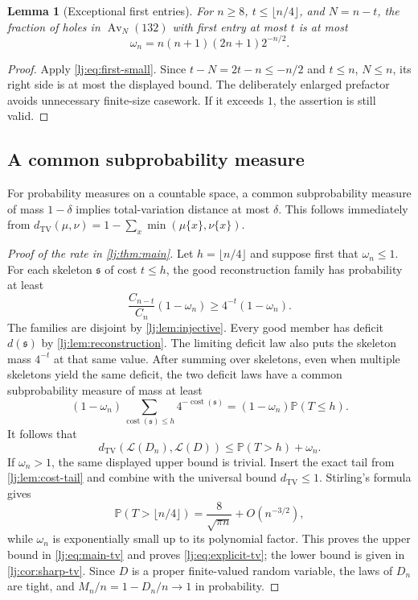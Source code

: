 \documentclass[11pt,a4paper]{article}
\newtheorem{lemma}[lemma]{Lemma}
\theoremstyle{definition}\newaliascnt{definition}{theorem}
\theoremstyle{remark}\newaliascnt{remark}{theorem}
\newcommand{\Av}{\operatorname{Av}}
\newcommand{\ljP}{\mathbb P}
\newcommand{\ljTV}{d_{\mathrm{TV}}}
\newcommand{\ljLaw}{\mathcal L}
\newcommand{\ljskel}{\mathfrak s}
\newcommand{\ljcost}{\operatorname{cost}}
\begin{document}
\begin{lemma}[Exceptional first entries]\label{lj:lem:exception}
For $n\ge8$, $t\le\lfloor n/4\rfloor$, and $N=n-t$, the fraction of
holes in $\Av_N(132)$ with first entry at most $t$ is at most
\begin{equation}
 \omega_n=n(n+1)(2n+1)2^{-n/2}.
 \label{lj:eq:epsilon}
\end{equation}
\end{lemma}
\begin{proof}
Apply \eqref{lj:eq:first-small}. Since $t-N=2t-n\le-n/2$ and
$t\le n$, $N\le n$, its right side is at most the displayed bound.
The deliberately enlarged prefactor avoids unnecessary finite-size
casework. If it exceeds $1$, the assertion is still valid.
\end{proof}

\subsection{A common subprobability measure}
For probability measures on a countable space, a common subprobability
measure of mass $1-\delta$ implies total-variation distance at most
$\delta$. This follows immediately from
$\ljTV(\mu,\nu)=1-\sum_x\min(\mu\{x\},\nu\{x\})$.

\begin{proof}[Proof of the rate in \cref{lj:thm:main}]
Let $h=\lfloor n/4\rfloor$ and suppose first that $\omega_n\le1$.
For each skeleton $\ljskel$ of cost $t\le h$, the good reconstruction
family has probability at least
\[
 \frac{C_{n-t}}{C_n}(1-\omega_n)
 \ge4^{-t}(1-\omega_n).
\]
The families are disjoint by \cref{lj:lem:injective}. Every good member has
deficit $d(\ljskel)$ by \cref{lj:lem:reconstruction}. The limiting deficit
law also puts the skeleton mass $4^{-t}$ at that same value.
After summing over skeletons, even when multiple skeletons yield the
same deficit, the two deficit laws have a common subprobability measure
of mass at least
\[
 (1-\omega_n)\sum_{\ljcost(\ljskel)\le h}4^{-\ljcost(\ljskel)}
 =(1-\omega_n)\ljP(T\le h).
\]
It follows that
\begin{equation}
 \ljTV(\ljLaw(D_n),\ljLaw(D))\le\ljP(T>h)+\omega_n.
 \label{lj:eq:tv-common}
\end{equation}
If $\omega_n>1$, the same displayed upper bound is trivial.
Insert the exact tail from \cref{lj:lem:cost-tail} and combine with the
universal bound $\ljTV\le1$. Stirling's formula gives
\[
 \ljP(T>\lfloor n/4\rfloor)
 =\frac8{\sqrt{\pi n}}+O(n^{-3/2}),
\]
while $\omega_n$ is exponentially small up to its polynomial
factor. This proves the upper bound in \eqref{lj:eq:main-tv} and proves
\eqref{lj:eq:explicit-tv}; the lower bound is given in
\cref{lj:cor:sharp-tv}.
Since $D$ is a proper finite-valued random variable, the laws of $D_n$
are tight, and $M_n/n=1-D_n/n\to1$ in probability.
\end{proof}
\end{document}
